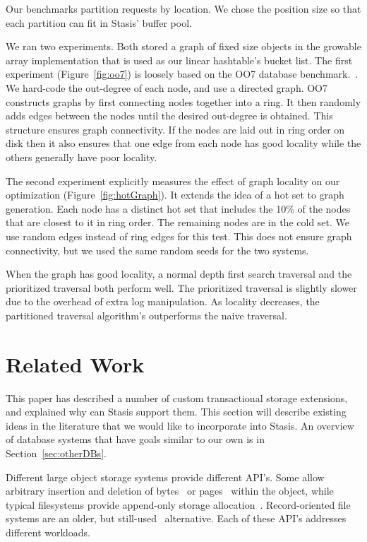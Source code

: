 \documentclass[letterpaper,twocolumn,10pt]{article}
\newcommand{\yad}{Stasis\xspace}
\newcommand{\yads}{Stasis'\xspace}
\begin{document}
Our benchmarks partition requests by location.  We chose the
position size so that each partition can fit in \yads buffer pool.

We ran two experiments.  Both stored a graph of fixed size objects in
the growable array implementation that is used as our linear
hashtable's bucket list.
The first experiment (Figure~\ref{fig:oo7})
is loosely based on the OO7 database benchmark.~\cite{oo7}.  We
hard-code the out-degree of each node, and use a directed graph.  OO7
constructs graphs by first connecting nodes together into a ring.
It then randomly adds edges between the nodes until the desired
out-degree is obtained.  This structure ensures graph connectivity.
If the nodes are laid out in ring order on disk then it also ensures that
one edge from each node has good locality while the others generally
have poor locality.

The second experiment explicitly measures the effect of graph locality
on our optimization (Figure~\ref{fig:hotGraph}). It extends the idea
of a hot set to graph generation.  Each node has a distinct hot set
that includes the 10\% of the nodes that are closest to it in ring
order.  The remaining nodes are in the cold set.  We use random edges
instead of ring edges for this test.  This does not ensure graph
connectivity, but we used the same random seeds for the two systems.

When the graph has good locality, a normal depth first search
traversal and the prioritized traversal both perform well.  The
prioritized traversal is slightly slower due to the overhead of extra
log manipulation. As locality decreases, the partitioned traversal
algorithm's outperforms the naive traversal.


\section{Related Work}

This paper has described a number of custom transactional storage
extensions, and explained why can \yad support them.  This section
will describe existing ideas in the literature that we would like to
incorporate into \yad.  An overview of database systems that have 
goals similar to our own is in Section~\ref{sec:otherDBs}.

Different large object storage systems provide different API's.
Some allow arbitrary insertion and deletion of bytes~\cite{esm} or
pages~\cite{sqlserver} within the object, while typical filesystems
provide append-only storage allocation~\cite{ffs}.
Record-oriented file systems are an older, but still-used~\cite{gfs}
alternative. Each of these API's addresses 
different workloads.
\end{document}
